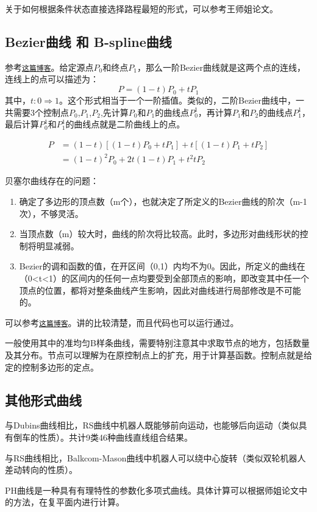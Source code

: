 关于如何根据条件状态直接选择路程最短的形式，可以参考王师姐论文。

\subsection{Bezier曲线 和 B-spline曲线}

参考\href{https://www.cnblogs.com/hnfxs/p/3148483.html}{\texttt{这篇博客}}。给定源点$P_0$和终点$P_1$，那么一阶Bezier曲线就是这两个点的连线，连线上的点可以描述为：
\begin{equation*}
    P = (1-t)P_0 + tP_1
\end{equation*}
其中，$t: 0 \Rightarrow 1$。这个形式相当于一个一阶插值。类似的，二阶Bezier曲线中，一共需要3个控制点$P_0$,$P_1$,$P_2$,先计算$P_0$和$P_1$的曲线点$P_0^1$，再计算$P_1$和$P_2$的曲线点$P_1^1$，最后计算$P_0^1$和$P_1^1$的曲线点就是二阶曲线上的点。

\begin{align*}
    P &= (1-t)\left[(1-t)P_0 + tP_1\right] + t\left[ (1-t)P_1 + tP_2\right] \\
      &= (1-t)^2 P_0 + 2t(1-t)P_1 + t^2 tP_2
\end{align*}

贝塞尔曲线存在的问题：
\begin{enumerate}
	\item 确定了多边形的顶点数（m个），也就决定了所定义的Bezier曲线的阶次（m-1次），不够灵活。
    \item 当顶点数（m）较大时，曲线的阶次将比较高。此时，多边形对曲线形状的控制将明显减弱。    
    \item Bezier的调和函数的值，在开区间（0,1）内均不为0。因此，所定义的曲线在（0<t<1）的区间内的任何一点均要受到全部顶点的影响，即改变其中任一个顶点的位置，都将对整条曲线产生影响，因此对曲线进行局部修改是不可能的。
\end{enumerate}


可以参考\href{https://blog.csdn.net/Mr_Grit/article/details/45603627}{\texttt{这篇博客}}。讲的比较清楚，而且代码也可以运行通过。

一般使用其中的准均匀B样条曲线，需要特别注意其中求取节点的地方，包括数量及其分布。节点可以理解为在原控制点上的扩充，用于计算基函数。控制点就是给定的控制多边形的定点。




\subsection{其他形式曲线}

与Dubins曲线相比，RS曲线中机器人既能够前向运动，也能够后向运动（类似具有倒车的性质）。共计9类46种曲线直线组合结果。


与RS曲线相比，Balkcom-Mason曲线中机器人可以绕中心旋转（类似双轮机器人差动转向的性质）。


PH曲线是一种具有有理特性的参数化多项式曲线。具体计算可以根据师姐论文中的方法，在复平面内进行计算。

